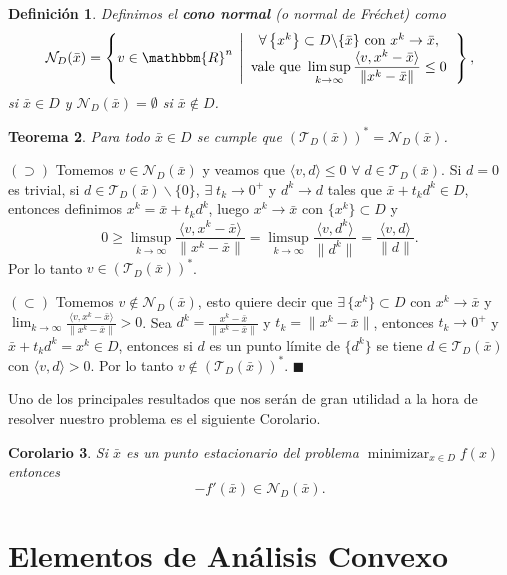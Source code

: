 \documentclass[a4paper,12pt]{report}
\newcommand{\la}{\langle}
\newcommand{\ra}{\rangle}
\newcommand{\RR}{\mathbbm{R}}
\newcommand{\Rn}{\RR^n}
\newcommand{\bx}{\bar{x}}
\newcommand{\mini}{\mathop{\mathrm{minimizar}}_{x\in D}f(x)}
\newcommand{\cN}{\mathcal{N}}
\newcommand{\cT}{\mathcal{T}}
\newcommand{\arr}{\rightarrow}
\newtheorem{teo}{Teorema}[section]
\newtheorem{cor}[teo]{Corolario}
\newtheorem{defi}[teo]{Definici\'on}
\newenvironment{dem}{\vspace*{-0.1cm}{\it Demostraci\'on:}}{\hfill
$\blacksquare$\\}
\begin{document}
\begin{defi}
Definimos el \textbf{cono normal} (o normal de Fr\'echet) como 
$$\cN_{D}(\bx)=\left\{v\in\Rn\;\left|\begin{array}{c}
\forall\left\{x^k\right\}\subset D\backslash\{\bx\}\mbox{ con } x^k\arr\bx,\\
\mbox{vale que }\displaystyle\limsup_{k\arr\infty}\frac{\la v,x^k-\bx\ra}{\|x^k-\bx\|}\leq 0\end{array}\right.\right\},$$
si $\bx\in D$ y $\mathcal{N}_{D}(\bx)=\emptyset$ si $\bx\notin D$.
\end{defi}


\begin{teo}\label{dualct}
Para todo $\bx\in D$ se cumple que $(\cT_{D}(\bx))^*=\cN_{D}(\bx)$.
\end{teo}
\begin{dem}
$(\supset)$ Tomemos $v\in\cN_{D}(\bx)$ y veamos que $\la v,d\ra\leq 0$ $\forall\; d\in\cT_D(\bx)$. Si $d=0$ es trivial, si $d\in\cT_{D}(\bx)\backslash\{0\}$, $\exists\;t_k\arr 0^+$ y $d^k\arr d$ tales que $\bx + t_kd^k\in D$, entonces definimos $x^k=\bx +t_kd^k$, luego $x^k\arr\bx$ con $\{x^k\}\subset D$ y 
$$0\geq\limsup_{k\arr\infty}\frac{\la v,x^k-\bx\ra}{\|x^k-\bx\|}=\limsup_{k\arr\infty}\frac{\la v,d^k\ra}{\|d^k\|}=\frac{\la v,d\ra}{\|d\|}.$$
Por lo tanto $v\in(\cT_{D}(\bx))^*$.


$(\subset)$ Tomemos $v\notin\cN_{D}(\bx)$, esto quiere decir que $\exists\, \{x^k\}\subset D$ con $x^k\arr\bx$ y \linebreak $\displaystyle{\lim_{k\arr\infty}\frac{\la v,x^k-\bx\ra}{\|x^k-\bx\|}>0}$. Sea $\displaystyle d^k=\frac{x^k-\bx}{\|x^k-\bx\|}$ y $t_k=\|x^k-\bx\|$, entonces $t_k\arr 0^+$ y $\bx+t_k d^k=x^k\in D$, entonces si $d$ es un punto l\'imite de $\{d^k\}$ se tiene $d\in\cT_{D}(\bx)$ con $\la v,d\ra>0$. Por lo tanto $v\notin(\cT_{D}(\bx))^*$. 
\end{dem}

Uno de los principales resultados que nos ser\'an de gran utilidad a la hora de resolver nuestro problema es el siguiente Corolario.

\begin{cor}
 Si $\bx$ es un punto estacionario del problema $\displaystyle\mini$ entonces
$$-f'(\bx)\in\cN_{D}(\bx).$$
\end{cor}


\section{Elementos de An\'alisis Convexo}
\end{document}
